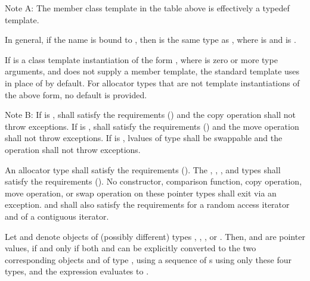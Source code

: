 \pnum
Note A: The member class template  in the table above is
effectively a typedef template. \begin{note} In general, if
the name  is bound to , then
 is the same type as
, where
 is  and
 is . \end{note} If
 is a class template instantiation of the form
, where  is zero or more type
arguments, and  does not supply a  member
template, the standard  template uses
 in place of 
by default. For allocator types that are not template instantiations of the
above form, no default is provided.

\pnum
Note B:
If  is ,
 shall satisfy the
 requirements ()
and the copy operation shall not throw exceptions.
If  is ,
 shall satisfy the
 requirements ()
and the move operation shall not throw exceptions.
If  is ,
lvalues of type  shall be swappable
and the  operation shall not throw exceptions.

\pnum
An allocator type  shall satisfy the
 requirements ().
The , , , and
 types shall satisfy the
 requirements ().
No constructor,
comparison function, copy operation, move operation, or swap operation on
these pointer types shall exit via an exception.  and  shall also
satisfy the requirements for
a random access iterator and of
a contiguous iterator.

\pnum
Let  and  denote objects of (possibly different) types
, , ,
or . Then,  and  are
 pointer values, if and only if both  and 
can be explicitly converted to the two corresponding objects  and 
of type , using a sequence of s
using only these four types, and the expression 
evaluates to .

